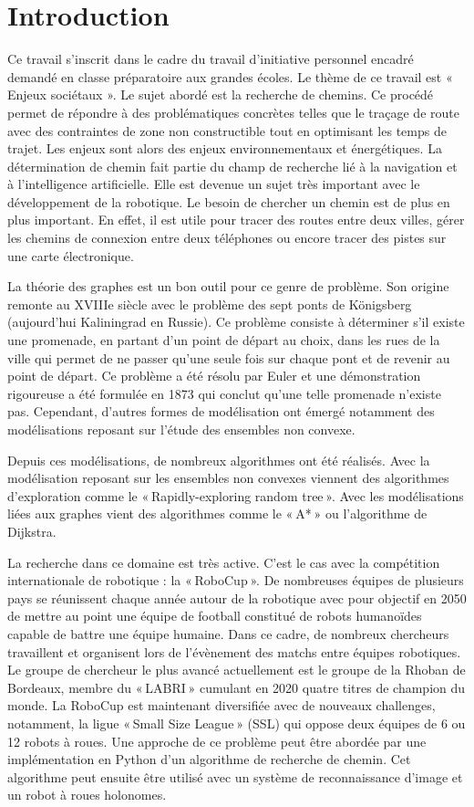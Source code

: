 \section{Introduction}
Ce travail s’inscrit dans le cadre du travail d’initiative personnel encadré demandé en classe préparatoire aux grandes écoles. 
Le thème de ce travail est « Enjeux sociétaux ».
Le sujet abordé est la recherche de chemins. Ce procédé permet de répondre à des problématiques concrètes telles que le traçage de route 
avec des contraintes de zone non constructible tout en optimisant les temps de trajet. Les enjeux sont alors des enjeux environnementaux 
et énergétiques.
La détermination de chemin fait partie du champ de recherche lié à la navigation et à l’intelligence artificielle. Elle est devenue un 
sujet très important avec le développement de la robotique.
Le besoin de chercher un chemin est de plus en plus important. En effet, il est utile pour tracer des routes entre deux villes, 
gérer les chemins de connexion entre deux téléphones ou encore tracer des pistes sur une carte électronique.

La théorie des graphes est un bon outil pour ce genre de problème. Son origine remonte au XVIIIe siècle avec le problème des 
sept ponts de Königsberg (aujourd’hui Kaliningrad en Russie). Ce problème consiste à déterminer s’il existe une promenade, 
en partant d’un point de départ au choix, dans les rues de la ville qui permet de ne passer qu’une seule fois sur chaque pont 
et de revenir au point de départ. Ce problème a été résolu par Euler et une démonstration rigoureuse a été formulée en 1873 qui 
conclut qu’une telle promenade n’existe pas. Cependant, d’autres formes de modélisation ont émergé notamment des modélisations 
reposant sur l’étude des ensembles non convexe.

Depuis ces modélisations, de nombreux algorithmes ont été réalisés. Avec la modélisation reposant sur les ensembles non convexes 
viennent des algorithmes d’exploration comme le « Rapidly-exploring random tree ». Avec les modélisations liées aux graphes vient 
des algorithmes comme le « A* » ou l’algorithme de Dijkstra. 

La recherche dans ce domaine est très active. C’est le cas avec la compétition internationale de robotique : la « RoboCup ». 
De nombreuses équipes de plusieurs pays se réunissent chaque année autour de la robotique avec pour objectif en 2050 de mettre au point une équipe de football constitué de robots humanoïdes capable de battre une équipe humaine. Dans ce cadre, de nombreux chercheurs travaillent et organisent lors de l’évènement des matchs entre équipes robotiques. Le groupe de chercheur le plus avancé actuellement est le groupe de la Rhoban de Bordeaux, membre du « LABRI » cumulant en 2020 quatre titres de champion du monde. La RoboCup est maintenant diversifiée avec de nouveaux challenges, notamment, la ligue « Small Size League » (SSL) qui oppose deux équipes de 6 ou 12 robots à roues.
Une approche de ce problème peut être abordée par une implémentation en Python d’un algorithme de recherche de chemin. 
Cet algorithme peut ensuite être utilisé avec un système de reconnaissance d’image et un robot à roues holonomes.

